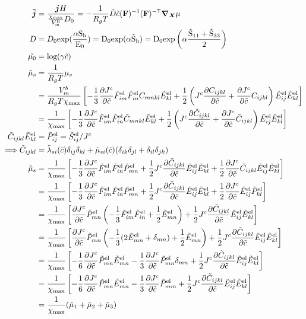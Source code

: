 \begin{align}
    \bm{\td{j}} &= \frac{\bm{j} H}{\cmax D_0} =-\fc{1}{R_g T} \td{D} \tc \inv{\F} \invT{\F} \nablaX \mu \\
    D &= D_0 \rm{exp}(\fc{\alpha S_h}{E_0}) = D_0 \rm{exp}(\alpha \td{S}_h)= D_0 \rm{exp}\left(\alpha \frac{\td{S}_{11}+\td{S}_{33}}{2}\right) \\ 
    \td{\mu_0} &= \text{log}(\gamma \td{c})\\
    \td{\mu}_s &= \frac{1}{R_g T} \mu_s \\
        &= \fc{V_m^b}{R_g T \xmax}\left[-\fc{1}{3}\pdiff{\jc}{\tc}\tFel{im}\tFel{in}{C}_{mnkl}\tEel{kl} + \fc{1}{2}\left(\jc \pdiff{C_{ijkl}}{\tc} + \pdiff{\jc}{\tc} C_{ijkl}\right)\tEel{ij}\tEel{kl}\right] \nonumber \\ 
        &= \fc{1}{\xmax}\left[-\fc{1}{3}\pdiff{\jc}{\tc}\tFel{im}\tFel{in}{\td{C}}_{mnkl}\tEel{kl} + \fc{1}{2}\left(\jc \pdiff{\td{C}_{ijkl}}{\tc} + \pdiff{\jc}{\tc} \td{C}_{ijkl}\right)\tEel{ij}\tEel{kl}\right] \\
    \td{C}_{ijkl} \tEel{kl} &= \tPel{ij}  = \tSel{ij}/\jc \\
    \Longrightarrow \td{C}_{ijkl} &= \td{\lambda}_{si}(\tc)\delta_{ij} \delta_{kl} +  \td{\mu}_{si}(\tc)(\delta_{ik} \delta_{jl} + \delta_{il} \delta_{jk})  \\
    \td{\mu}_s &= \fc{1}{\xmax}\left[-\fc{1}{3}\pdiff{\jc}{\tc}\tFel{im}\tFel{in}\tPel{mn} + \fc{1}{2}\jc \pdiff{\td{C}_{ijkl}}{\tc}\tEel{ij}\tEel{kl} + \fc{1}{2} \pdiff{\jc}{\tc} \td{C}_{ijkl}\tEel{ij}\tEel{kl}\right] \nonumber\\
    &= \fc{1}{\xmax}\left[-\fc{1}{3}\pdiff{\jc}{\tc}\tFel{im}\tFel{in}\tPel{mn} + \fc{1}{2}\jc \pdiff{\td{C}_{ijkl}}{\tc}\tEel{ij}\tEel{kl} + \fc{1}{2} \pdiff{\jc}{\tc} \tEel{ij}\tPel{kl}\right] \nonumber\\
    &= \fc{1}{\xmax}\left[\pdiff{\jc}{\tc} \tPel{mn} \left( -\fc{1}{3}\tFel{im}\tFel{in}+ \fc{1}{2} \tEel{mn}\right)+ \fc{1}{2}\jc \pdiff{\td{C}_{ijkl}}{\tc}\tEel{ij}\tEel{kl} \right] \nonumber\\
    &= \fc{1}{\xmax}\left[\pdiff{\jc}{\tc} \tPel{mn} \left( -\fc{1}{3}(2\tEel{mn}+\delta_{mn})+ \fc{1}{2} \tEel{mn}\right)+ \fc{1}{2}\jc \pdiff{\td{C}_{ijkl}}{\tc}\tEel{ij}\tEel{kl} \right] \nonumber\\
    &= \fc{1}{\xmax}\left[-\fc{1}{6}\pdiff{\jc}{\tc} \tPel{mn} \tEel{mn} - \fc{1}{3}\pdiff{\jc}{\tc} \tPel{mn}\delta_{mn} +  \fc{1}{2}\jc \pdiff{\td{C}_{ijkl}}{\tc}\tEel{ij}\tEel{kl} \right]\nonumber \\
    &= \fc{1}{\xmax}\left[-\fc{1}{6}\pdiff{\jc}{\tc} \tPel{mn} \tEel{mn} - \fc{1}{3 }\pdiff{\jc}{\tc} \tPel{mm} +  \fc{1}{2}\jc \pdiff{\td{C}_{ijkl}}{\tc}\tEel{ij}\tEel{kl} \right] \nonumber\\
    &= \frac{1}{\xmax}(\td{\mu}_1 + \td{\mu}_2 + \td{\mu}_3)
\end{align}



